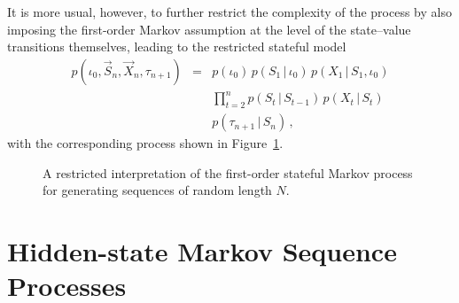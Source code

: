 \documentclass[a4paper]{article}
\begin{document}
It is more usual, however, to further restrict the complexity of the process 
by also imposing the first-order Markov assumption at the level
of the state--value transitions themselves, leading to the restricted stateful  model
\begin{eqnarray}
p(\iota_0,\vec{S}_n,\vec{X}_n,\tau_{n+1}) & = & 
p(\iota_0)\,p(S_1\,|\,\iota_0)\,p(X_1\,|\,S_1,\iota_0)
\nonumber\\&&
\prod_{t=2}^{n}p(S_t\,|\,S_{t-1})
\,p(X_t\,|\,S_t)
\nonumber\\&&
p(\tau_{n+1}\,|\,S_n)
\,,
\label{eq:1-stateful-markov-model}
\end{eqnarray}
with the corresponding process shown in Figure~\ref{fig:1-stateful-1-process}.
\begin{figure}[hbt]
\centering
{}
\caption{A restricted interpretation of the first-order stateful Markov process for generating sequences of random length $N$.}
\label{fig:1-stateful-1-process}
\end{figure}

\section{Hidden-state Markov Sequence Processes}
\end{document}
